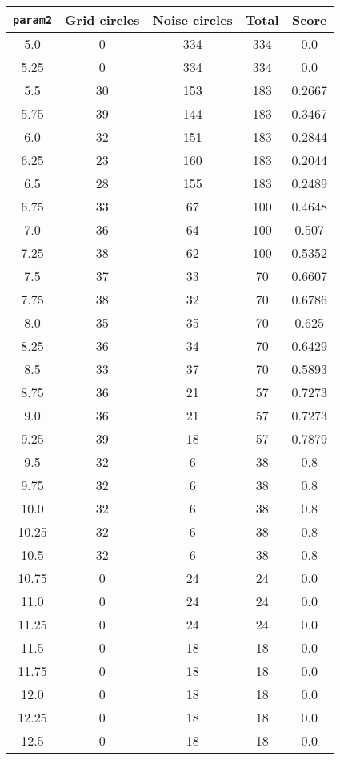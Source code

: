 \documentclass[letterpaper, 12pt]{article}
\begin{document}
\begin{longtable}{|c|c|c|c|c|}
\hline
\textbf{\texttt{param2}} & \textbf{Grid circles} & \textbf{Noise circles} & \textbf{Total} & \textbf{Score} \\
\hline
5.0 & 0 & 334 & 334 & 0.0 \\
\hline
5.25 & 0 & 334 & 334 & 0.0 \\
\hline
5.5 & 30 & 153 & 183 & 0.2667 \\
\hline
5.75 & 39 & 144 & 183 & 0.3467 \\
\hline
6.0 & 32 & 151 & 183 & 0.2844 \\
\hline
6.25 & 23 & 160 & 183 & 0.2044 \\
\hline
6.5 & 28 & 155 & 183 & 0.2489 \\
\hline
6.75 & 33 & 67 & 100 & 0.4648 \\
\hline
7.0 & 36 & 64 & 100 & 0.507 \\
\hline
7.25 & 38 & 62 & 100 & 0.5352 \\
\hline
7.5 & 37 & 33 & 70 & 0.6607 \\
\hline
7.75 & 38 & 32 & 70 & 0.6786 \\
\hline
8.0 & 35 & 35 & 70 & 0.625 \\
\hline
8.25 & 36 & 34 & 70 & 0.6429 \\
\hline
8.5 & 33 & 37 & 70 & 0.5893 \\
\hline
8.75 & 36 & 21 & 57 & 0.7273 \\
\hline
9.0 & 36 & 21 & 57 & 0.7273 \\
\hline
9.25 & 39 & 18 & 57 & 0.7879 \\
\hline
9.5 & 32 & 6 & 38 & 0.8 \\
\hline
9.75 & 32 & 6 & 38 & 0.8 \\
\hline
10.0 & 32 & 6 & 38 & 0.8 \\
\hline
10.25 & 32 & 6 & 38 & 0.8 \\
\hline
10.5 & 32 & 6 & 38 & 0.8 \\
\hline
10.75 & 0 & 24 & 24 & 0.0 \\
\hline
11.0 & 0 & 24 & 24 & 0.0 \\
\hline
11.25 & 0 & 24 & 24 & 0.0 \\
\hline
11.5 & 0 & 18 & 18 & 0.0 \\
\hline
11.75 & 0 & 18 & 18 & 0.0 \\
\hline
12.0 & 0 & 18 & 18 & 0.0 \\
\hline
12.25 & 0 & 18 & 18 & 0.0 \\
\hline
12.5 & 0 & 18 & 18 & 0.0 \\

\end{longtable}
\end{document}
